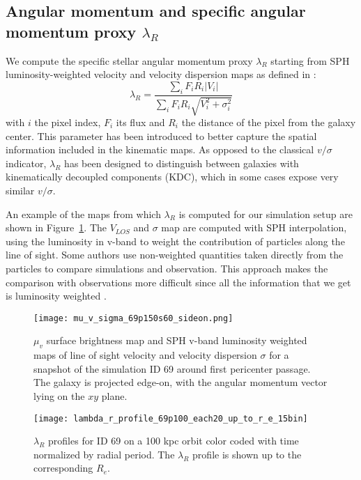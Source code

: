 \subsection{Angular momentum and specific angular momentum proxy $\lambda_R$}
We compute the specific stellar angular momentum proxy $\lambda_R$ starting from SPH luminosity-weighted velocity and velocity dispersion maps as defined in \citet{Emsellem2007}: %
\begin{equation}
 \lambda_R = \dfrac{\sum_i F_i R_i |V_i|}{\sum_i F_i R_i \sqrt{V_i^2 + \sigma_i^2}}
\end{equation}
with $i$ the pixel index, $F_i$ its flux and $R_i$ the distance of the pixel from the galaxy center.
This parameter has been introduced to better capture the spatial information included in the kinematic maps.
As opposed to the classical $v/\sigma$ indicator, $\lambda_R$ has been designed to distinguish between galaxies with kinematically decoupled components (KDC), which in some cases expose very similar $v/\sigma$.

An example of the maps from which $\lambda_R$ is computed for our simulation setup are shown in Figure~\ref{fig:maps_lambda_r}.
The $V_{LOS}$ and $\sigma$ map are computed with SPH interpolation, using the luminosity in $\mathrm{v}$-band to weight the contribution of particles along the line of sight.
Some authors \citep[e.g.][]{Schulze2018,Pillepich2019} use non-weighted quantities taken directly from the particles to compare simulations and observation.%
This approach makes the comparison with observations more difficult since all the information that we get is luminosity weighted \citep{Walo-Martin2020}.

\begin{figure}[t]
\centering
\texttt{[image: mu\_v\_sigma\_69p150s60\_sideon.png]}
\caption{$\mu_v$ surface brightness map and SPH v-band luminosity weighted maps of line of sight velocity and velocity dispersion $\sigma$ for a snapshot of the simulation ID 69 around first pericenter passage.
The galaxy is projected edge-on, with the angular momentum vector lying on the $xy$ plane.}
\label{fig:maps_lambda_r}
\end{figure}

\begin{figure}[b]
\centering
\texttt{[image: lambda\_r\_profile\_69p100\_each20\_up\_to\_r\_e\_15bin]}
\caption{$\lambda_R$ profiles for ID 69 on a 100 kpc orbit color coded with time normalized by radial period.
The $\lambda_R$ profile is shown up to the corresponding $R_e$.}
\label{fig:lambda_r_profile}
\end{figure}


